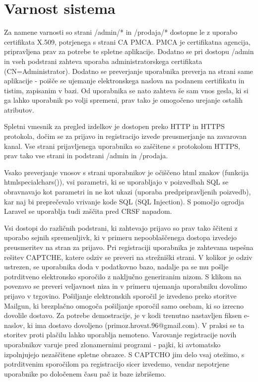 \documentclass[a4paper,12pt]{report}
\begin{document}
\chapter{Varnost sistema}

Za namene varnosti so strani /admin/* in /prodaja/* dostopne le z uporabo certifikata X.509, potrjenega s strani CA PMCA. PMCA je certifikatna agencija, pripravljena prav za potrebe te spletne aplikacije. Dodatno se pri dostopu /admin in vseh podstrani zahteva uporaba administratorskega certifikata (CN=Administrator). Dodatno se preverjanje uporabnika preverja na strani same aplikacije - poišče se ujemanje elektronskega naslova na podanem certifikatu in tistim, zapisanim v bazi. Od uporabnika se nato zahteva še sam vnos gesla, ki si ga lahko uporabnik po volji spremeni, prav tako je omogočeno urejanje ostalih atributov.

Spletni vmesnik za pregled izdelkov je dostopen preko HTTP in HTTPS protokola, dočim se za prijavo in registracijo izvede preusmerjanje na zavarovan kanal. Vse strani prijavljenega uporabnika so zaščitene s protokolom HTTPS, prav tako vse strani in podstrani /admin in /prodaja.

Vsako preverjanje vnosov s strani uporabnikov je očiščeno html znakov (funkcija htmlspecialchars()), vsi parametri, ki se uporabljajo v poizvedbah SQL se obravnavajo kot parametri in ne kot ukazi (uporaba predpripravljenih poizvedb), kar naj bi preprečevalo vrivanje kode SQL (SQL Injection). S pomočjo ogrodja Laravel se uporablja tudi zaščita pred CRSF napadom.

Vsi dostopi do različnih podstrani, ki zahtevajo prijavo so prav tako ščiteni z uporabo sejnih spremenljivk, ki v primeru nepooblaščenega dostopa izvedejo preusmeritev na stran za prijavo. Pri registraciji uporabnika je zahtevana uspešna rešitev CAPTCHE, katere odziv se preveri na strežniški strani. V kolikor je odziv ustrezen, se uporabnika doda v podatkovno bazo, nadalje pa se mu pošlje potrditveno elektronsko sporočilo z naključno generiranim nizom. S klikom na povezavo se preveri veljavnost niza in v primeru ujemanja uporabniku dovolimo prijavo v trgovino. Pošiljanje elektronskih sporočil je izvedeno preko storitve Mailgun, ki brezplačno omogoča pošiljanje sporočil samo osebam, ki so izrecno dovolile dostavo. Za potrebe demostracije, je v kodi trenutno nastavljen fiksen e-naslov, ki ima dostavo dovoljeno (primoz.hrovat.96@gmail.com). V praksi se ta storitev proti plačilu lahko uporablja nemoteno. Varovanje registracije novih uporabnikov varuje pred zlonamernimi programi - pajki, ki avtomatsko izpolnjujejo nezaščitene spletne obrazce. S CAPTCHO jim delo vsaj otežimo, s potrditvenim sporočilom pa registracijo sicer izvedemo, vendar nepotrjene uporabnike po določenem času pač iz baze izbrišemo.
\end{document}
